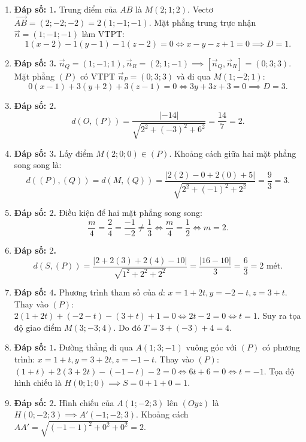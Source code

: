 \documentclass[12pt,a4paper]{article}
\begin{document}
\begin{enumerate}
\item \textbf{Đáp số: $1$.}  
Trung điểm của $AB$ là $M(2; 1; 2)$. Vectơ $\vec{AB} = (2; -2; -2) = 2(1; -1; -1)$.  
Mặt phẳng trung trực nhận $\vec{n} = (1; -1; -1)$ làm VTPT:
\[
1(x - 2) - 1(y - 1) - 1(z - 2) = 0 \iff x - y - z + 1 = 0 \implies D = 1.
\]

\item \textbf{Đáp số: $3$.}  
$\vec{n}_Q = (1; -1; 1), \vec{n}_R = (2; 1; -1) \implies [\vec{n}_Q, \vec{n}_R] = (0; 3; 3)$.  
Mặt phẳng $(P)$ có VTPT $\vec{n}_P = (0; 3; 3)$ và đi qua $M(1; -2; 1)$:
\[
0(x - 1) + 3(y + 2) + 3(z - 1) = 0 \iff 3y + 3z + 3 = 0 \implies D = 3.
\]

\item \textbf{Đáp số: $2$.}  
\[
d(O, (P)) = \dfrac{|-14|}{\sqrt{2^2 + (-3)^2 + 6^2}} = \dfrac{14}{7} = 2.
\]

\item \textbf{Đáp số: $3$.}  
Lấy điểm $M(2; 0; 0) \in (P)$. Khoảng cách giữa hai mặt phẳng song song là:
\[
d((P), (Q)) = d(M, (Q)) = \dfrac{|2(2) - 0 + 2(0) + 5|}{\sqrt{2^2 + (-1)^2 + 2^2}} = \dfrac{9}{3} = 3.
\]

\item \textbf{Đáp số: $2$.}  
Điều kiện để hai mặt phẳng song song:
\[
\dfrac{m}{4} = \dfrac{2}{4} = \dfrac{-1}{-2} \ne \dfrac{1}{3} \iff \dfrac{m}{4} = \dfrac{1}{2} \iff m = 2.
\]

\item \textbf{Đáp số: $2$.}  
\[
d(S, (P)) = \dfrac{|2 + 2(3) + 2(4) - 10|}{\sqrt{1^2 + 2^2 + 2^2}} = \dfrac{|16 - 10|}{3} = \dfrac{6}{3} = 2\text{ mét}.
\]

\item \textbf{Đáp số: $4$.}  
Phương trình tham số của $d$: $x = 1 + 2t, y = -2 - t, z = 3 + t$.  
Thay vào $(P)$: $2(1 + 2t) + (-2 - t) - (3 + t) + 1 = 0 \iff 2t - 2 = 0 \iff t = 1$.  
Suy ra tọa độ giao điểm $M(3; -3; 4)$. Do đó $T = 3 + (-3) + 4 = 4$.

\item \textbf{Đáp số: $1$.}  
Đường thẳng đi qua $A(1; 3; -1)$ vuông góc với $(P)$ có phương trình: $x = 1 + t, y = 3 + 2t, z = -1 - t$.  
Thay vào $(P)$: $(1 + t) + 2(3 + 2t) - (-1 - t) - 2 = 0 \iff 6t + 6 = 0 \iff t = -1$.  
Tọa độ hình chiếu là $H(0; 1; 0) \implies S = 0 + 1 + 0 = 1$.

\item \textbf{Đáp số: $2$.}  
Hình chiếu của $A(1; -2; 3)$ lên $(Oyz)$ là $H(0; -2; 3) \implies A'(-1; -2; 3)$.  
Khoảng cách $AA' = \sqrt{(-1 - 1)^2 + 0^2 + 0^2} = 2$.


\end{enumerate}
\end{document}
